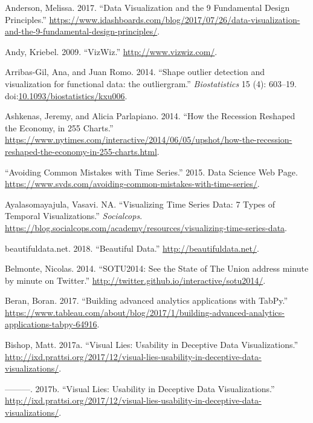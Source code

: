 \documentclass[]{book}
\begin{document}
\hypertarget{ref-design_principles}{}
Anderson, Melissa. 2017. ``Data Visualization and the 9 Fundamental
Design Principles.''
\url{https://www.idashboards.com/blog/2017/07/26/data-visualization-and-the-9-fundamental-design-principles/}.

\hypertarget{ref-vizwiz}{}
Andy, Kriebel. 2009. ``VizWiz.'' \url{http://www.vizwiz.com/}.

\hypertarget{ref-outliar}{}
Arribas-Gil, Ana, and Juan Romo. 2014. ``Shape outlier detection and
visualization for functional data: the outliergram.''
\emph{Biostatistics} 15 (4): 603--19.
doi:\href{https://doi.org/10.1093/biostatistics/kxu006}{10.1093/biostatistics/kxu006}.

\hypertarget{ref-recession_economy}{}
Ashkenas, Jeremy, and Alicia Parlapiano. 2014. ``How the Recession
Reshaped the Economy, in 255 Charts.''
\url{https://www.nytimes.com/interactive/2014/06/05/upshot/how-the-recession-reshaped-the-economy-in-255-charts.html}.

\hypertarget{ref-TimeSeries}{}
``Avoiding Common Mistakes with Time Series.'' 2015. Data Science Web
Page.
\url{https://www.svds.com/avoiding-common-mistakes-with-time-series/}.

\hypertarget{ref-aya-time-series}{}
Ayalasomayajula, Vasavi. NA. ``Visualizing Time Series Data: 7 Types of
Temporal Visualizations.'' \emph{Socialcops}.
\url{https://blog.socialcops.com/academy/resources/visualizing-time-series-data}.

\hypertarget{ref-data_beaut}{}
beautifuldata.net. 2018. ``Beautiful Data.''
\url{http://beautifuldata.net/}.

\hypertarget{ref-SotU2014}{}
Belmonte, Nicolas. 2014. ``SOTU2014: See the State of The Union address
minute by minute on Twitter.''
\url{http://twitter.github.io/interactive/sotu2014/}.

\hypertarget{ref-TabPy}{}
Beran, Boran. 2017. ``Building advanced analytics applications with
TabPy.''
\url{https://www.tableau.com/about/blog/2017/1/building-advanced-analytics-applications-tabpy-64916}.

\hypertarget{ref-visual-lies}{}
Bishop, Matt. 2017a. ``Visual Lies: Usability in Deceptive Data
Visualizations.''
\url{http://ixd.prattsi.org/2017/12/visual-lies-usability-in-deceptive-data-visualizations/}.

\hypertarget{ref-study_asks}{}
---------. 2017b. ``Visual Lies: Usability in Deceptive Data
Visualizations.''
\url{http://ixd.prattsi.org/2017/12/visual-lies-usability-in-deceptive-data-visualizations/}.
\end{document}
